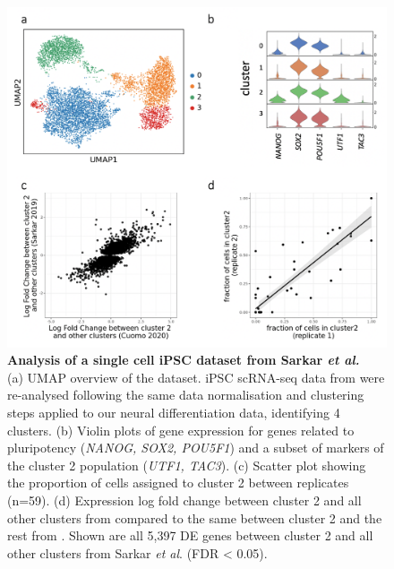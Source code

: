\begin{figure}[h]
    \centering
    \includegraphics[width=15cm]{Appendix2/Fig/suppl_ipsc_cluster2_sarkar.png}
    \caption[Analysis of a single cell iPSC dataset from Sarkar \textit{et al.}]{\textbf{Analysis of a single cell iPSC dataset from Sarkar \textit{et al.}}\\
    (a) UMAP overview of the dataset. 
    iPSC scRNA-seq data from \cite{sarkar2019discovery} were re-analysed following the same data normalisation and clustering steps applied to our neural differentiation data, identifying 4 clusters. 
    (b) Violin plots of gene expression for genes related to pluripotency (\textit{NANOG, SOX2, POU5F1}) and a subset of markers of the cluster 2 population (\textit{UTF1, TAC3}). 
    (c) Scatter plot showing the proportion of cells assigned to cluster 2 between replicates (n=59). 
    (d) Expression log fold change between cluster 2 and all other clusters from \cite{cuomo2020single} compared to the same between cluster 2 and the rest from \cite{sarkar2019discovery}. 
    Shown are all 5,397 DE genes between cluster 2 and all other clusters from Sarkar \textit{et al}. (FDR < 0.05).}
    \label{suppl_fig:ipsc_cluster2_sarkar}
\end{figure}

